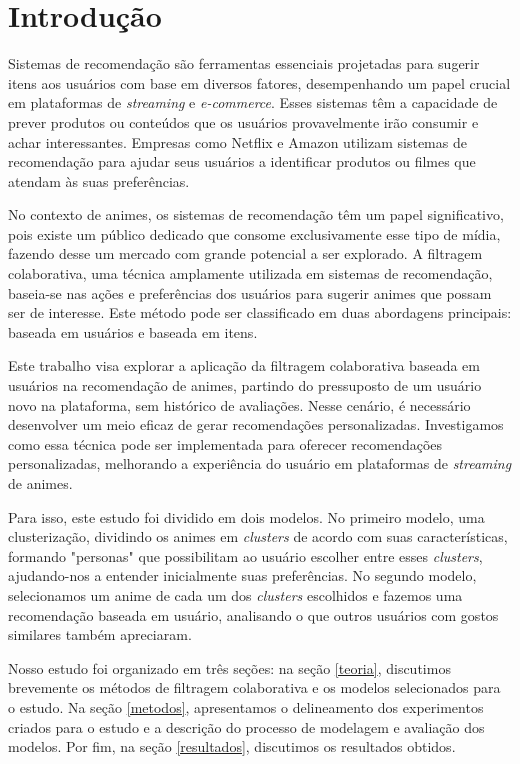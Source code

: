 \documentclass[twocolumn]{rbef}
\newcommand{\1}{\mathbbm{1}}
\begin{document}
\section{Introdução} \label{introducao}

Sistemas de recomendação são ferramentas essenciais projetadas para sugerir itens aos usuários com base em diversos fatores, desempenhando um papel crucial em plataformas de \textit{streaming} e \textit{e-commerce}. Esses sistemas têm a capacidade de prever produtos ou conteúdos que os usuários provavelmente irão consumir e achar interessantes. Empresas como Netflix e Amazon utilizam sistemas de recomendação para ajudar seus usuários a identificar produtos ou filmes que atendam às suas preferências.

No contexto de animes, os sistemas de recomendação têm um papel significativo, pois existe um público dedicado que consome exclusivamente esse tipo de mídia, fazendo desse um mercado com grande potencial a ser explorado. A filtragem colaborativa, uma técnica amplamente utilizada em sistemas de recomendação, baseia-se nas ações e preferências dos usuários para sugerir animes que possam ser de interesse. Este método pode ser classificado em duas abordagens principais: baseada em usuários e baseada em itens.

Este trabalho visa explorar a aplicação da filtragem colaborativa baseada em usuários na recomendação de animes, partindo do pressuposto de um usuário novo na plataforma, sem histórico de avaliações. Nesse cenário, é necessário desenvolver um meio eficaz de gerar recomendações personalizadas. Investigamos como essa técnica pode ser implementada para oferecer recomendações personalizadas, melhorando a experiência do usuário em plataformas de \textit{streaming} de animes.

Para isso, este estudo foi dividido em dois modelos. No primeiro modelo, uma clusterização, dividindo os animes em \textit{clusters} de acordo com suas características, formando "personas" que possibilitam ao usuário escolher entre esses \textit{clusters}, ajudando-nos a entender inicialmente suas preferências. No segundo modelo, selecionamos um anime de cada um dos \textit{clusters} escolhidos e fazemos uma recomendação baseada em usuário, analisando o que outros usuários com gostos similares também apreciaram.

Nosso estudo foi organizado em três seções: na seção \ref{teoria}, discutimos brevemente os métodos de filtragem colaborativa e os modelos selecionados para o estudo. Na seção \ref{metodos}, apresentamos o delineamento dos experimentos criados para o estudo e a descrição do processo de modelagem e avaliação dos modelos. Por fim, na seção \ref{resultados}, discutimos os resultados obtidos. 
\end{document}
